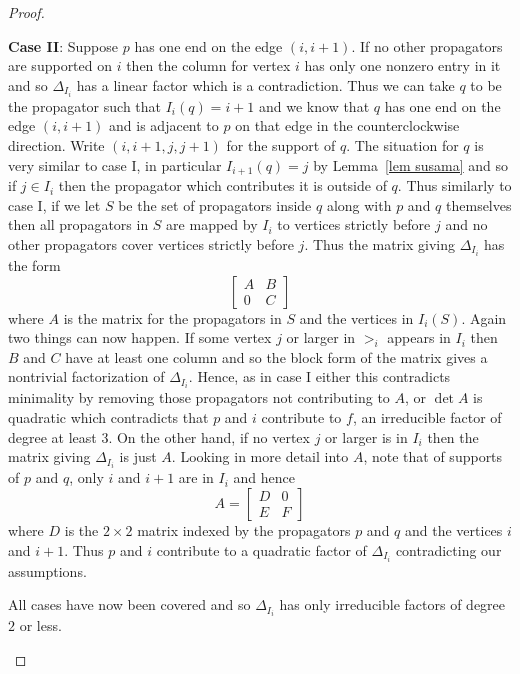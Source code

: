 \documentclass[11pt]{article}
\theoremstyle{remark}
\theoremstyle{definition}
\begin{document}
\begin{proof}
\begin{enumerate}
\textbf{Case II}: Suppose $p$ has one end on the edge $(i, i+1)$.  If no other propagators are supported on $i$ then the column for vertex $i$ has only one nonzero entry in it and so $\Delta_{I_i}$ has a linear factor which is a contradiction.  Thus we can take $q$ to be the propagator such that $I_i(q)=i+1$ and we know that $q$ has one end on the edge $(i, i+1)$ and is adjacent to $p$ on that edge in the counterclockwise direction.  Write $(i, i+1, j, j+1)$ for the support of $q$.  The situation for $q$ is very similar to case I, in particular $I_{i+1}(q) = j$ by Lemma~\ref{lem susama} and so if $j\in I_i$ then the propagator which contributes it is outside of $q$.  Thus similarly to case I, if we let $S$ be the set of propagators inside $q$ along with $p$ and $q$ themselves then all propagators in $S$ are mapped by $I_i$ to vertices strictly before $j$ and no other propagators cover vertices strictly before $j$.  Thus the matrix giving $\Delta_{I_i}$ has the form
\[
\begin{bmatrix} A & B \\ 0 & C\end{bmatrix}
\]
where $A$ is the matrix for the propagators in $S$ and the vertices in $I_i(S)$. Again two things can now happen.  If some vertex $j$ or larger in $>_i$ appears in $I_i$ then $B$ and $C$ have at least one column and so the block form of the matrix gives a nontrivial factorization of $\Delta_{I_i}$.  Hence, as in case I either this contradicts minimality by removing those propagators not contributing to $A$, or $\det A$ is quadratic which contradicts that $p$ and $i$ contribute to $f$, an irreducible factor of degree at least 3.  On the other hand, if no vertex $j$ or larger is in $I_i$ then the matrix giving $\Delta_{I_i}$ is just $A$.  Looking in more detail into $A$, note that of supports of $p$ and $q$, only $i$ and $i+1$ are in $I_i$ and hence
\[
A = \begin{bmatrix} D & 0 \\ E & F\end{bmatrix}
\]
where $D$ is the $2\times 2$ matrix indexed by the propagators $p$ and $q$ and the vertices $i$ and $i+1$.  Thus $p$ and $i$ contribute to a quadratic factor of $\Delta_{I_i}$ contradicting our assumptions.

All cases have now been covered and so $\Delta_{I_i}$ has only irreducible factors of degree $2$ or less.


\end{enumerate}
\end{proof}
\end{document}

